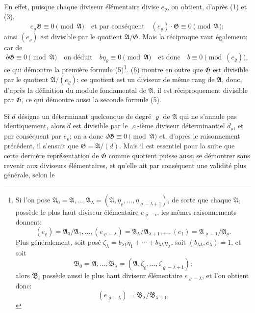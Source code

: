 \documentclass[11pt]{article}
\providecommand{\Amod}{\mathfrak A}
\providecommand{\Bmod}{\mathfrak B}
\providecommand{\Gmod}{\mathfrak G}
\providecommand{\zero}[1]{\equiv 0\pmod{#1}}
\begin{document}
En effet, puisque chaque diviseur élémentaire divise $e_\varrho$, on obtient, d'après (1) et (3),
\begin{equation}
 e_\varrho\Gmod\zero{\Amod}\quad \text{et par conséquent}\quad (e_\varrho)\cdot\Gmod\zero{\Amod};
\tag{6}
\end{equation}
ainsi $(e_\varrho)$ est divisible par le quotient $\Amod/\Gmod$. Mais la réciproque vaut également; car de
\[
 b\Gmod\zero{\Amod}
 \quad\text{on déduit}\quad b\eta_\varrho\zero{\Amod}
 \quad\text{et donc}\quad b\zero{(e_\varrho)},
\]
ce qui démontre la première formule (5)\footnote{Si l'on pose $\Amod_0=\Amod,\ldots,\Amod_\lambda=(\Amod,\eta_\varrho,\ldots,\eta_{\varrho-\lambda+1})$, de sorte que chaque $\Amod_i$ possède le plus haut diviseur élémentaire $e_{\varrho-i}$, les mêmes raisonnements donnent:
\[
 (e_\varrho)=\Amod_0/\Amod_1,\ldots,(e_{\varrho-\lambda})=\Amod_\lambda/\Amod_{\lambda+1},\ldots,(e_1)=\Amod_{\varrho-1}/\Amod_\varrho.
\]
Plus généralement, soit posé $\zeta_\lambda=b_{\lambda1}\eta_1+\cdots+b_{\lambda\lambda}\eta_\lambda$, soit $(b_{\lambda\lambda},e_\lambda)=1$, et soit
\[
 \Bmod_0=\Amod,\ldots,\Bmod_\lambda=(\Amod,\zeta_\varrho,\ldots,\zeta_{\varrho-\lambda+1});
\]
alors $\Bmod_i$ possède aussi le plus haut diviseur élémentaire $e_{\varrho-\lambda}$, et l'on obtient donc:
\[
 (e_{\varrho-\lambda})=\Bmod_\lambda/\Bmod_{\lambda+1}.
\]}. (6) montre en outre que $\Gmod$ est divisible par le quotient $\Amod/(e_\varrho)$; ce quotient est un diviseur de même rang de $\Amod$, donc, d'après la définition du module fondamental de $\Amod$, il est réciproquement divisible par $\Gmod$, ce qui démontre aussi la seconde formule (5).

Si $d$ désigne un déterminant quelconque de degré $\varrho$ de $\Amod$ qui ne s'annule pas identiquement, alors $d$ est divisible par le $\varrho$-ième diviseur déterminantiel $d_\varrho$, et par conséquent par $e_\varrho$; on a donc $d\Gmod\zero{\Amod}$ et, d'après le raisonnement précédent, il s'ensuit que $\Gmod=\Amod/(d)$. Mais il est essentiel pour la suite que cette dernière représentation de $\Gmod$ comme quotient puisse aussi se démontrer sans revenir aux diviseurs élémentaires, et qu'elle ait par conséquent une validité plus générale, selon le
\end{document}

